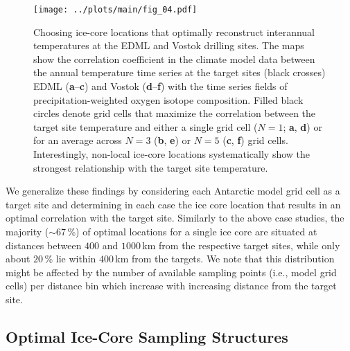 \documentclass[draft]{agujournal2019}
\begin{document}
\begin{figure*}[t]%
\centering
\texttt{[image: ../plots/main/fig\_04.pdf]}
\caption[Picking optimal sites]{%
  Choosing ice-core locations that optimally reconstruct interannual
  temperatures at the EDML and Vostok drilling sites. The maps show the
  correlation coefficient in the climate model data between the annual
  temperature time series at the target sites (black crosses) EDML
  (\textbf{a}--\textbf{c}) and Vostok (\textbf{d}--\textbf{f}) with the time
  series fields of precipitation-weighted oxygen isotope composition. Filled
  black circles denote grid cells that maximize the correlation between the
  target site temperature and either a single grid cell ($N=1$; \textbf{a},
  \textbf{d}) or for an average across $N=3$ (\textbf{b}, \textbf{e}) or $N=5$
  (\textbf{c}, \textbf{f}) grid cells. Interestingly, non-local ice-core
  locations systematically show the strongest relationship with the target site
  temperature.}
\label{fig:picking}%
\end{figure*}%

We generalize these findings by considering each Antarctic model grid cell as a
target site and determining in each case the ice core location that results in
an optimal correlation with the target site. Similarly to the above case
studies, the majority ($\sim67$\,\%) of optimal locations for a single ice core
are situated at distances between $400$ and $1000$\,km from the respective
target sites, while only about $20$\,\% lie within $400$\,km from the
targets. We note that this distribution might be affected by the number of
available sampling points (i.e., model grid cells) per distance bin which
increase with increasing distance from the target site.

\subsection{Optimal Ice-Core Sampling Structures}
\label{results:optim-spacing}
\end{document}
